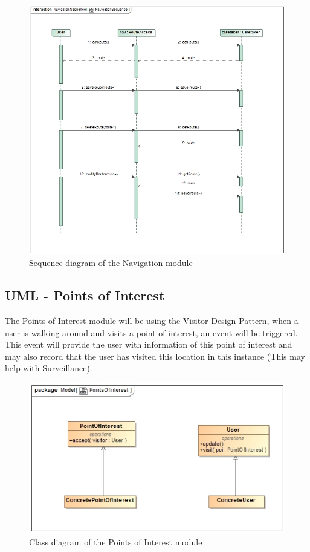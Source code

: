 \documentclass[12pt,a4paper]{article}
\begin{document}
	\begin{figure}
		\includegraphics[width=\linewidth]{Images/NavigationSequence.jpg}
		\caption{Sequence diagram of the Navigation module}
	\end{figure}
	
	\subsection{UML - Points of Interest}
	The Points of Interest module will be using the Visitor Design Pattern, when a user is walking around and visits a point of interest, an event will be triggered. This event will provide the user with information of this point of interest and may also record that the user has visited this location in this instance (This may help with Surveillance).
	\begin{figure}
		\includegraphics[width=\linewidth]{Images/PointsOfInterest.jpg}
		\caption{Class diagram of the Points of Interest module}
	\end{figure}
	
\end{document}
